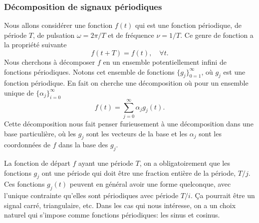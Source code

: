 \documentclass[a4paper,12pt]{book}
\begin{document}
\subsubsection{Décomposition de signaux périodiques}

Nous allons considérer une fonction $f(t)$ qui est une fonction périodique, de période $T$, de pulsation $\omega=2\pi/T$ et
de fréquence $\nu=1/T$. Ce genre de fonction a la propriété suivante
\begin{equation}
 f(t+T)=f(t),\quad \forall t.
\end{equation}
Nous cherchons à décomposer $f$ en un ensemble potentiellement infini de fonctions périodiques. Notons
cet ensemble de fonctions $\{g_j\}_{0=1}^\infty$, où $g_j$ est une fonction périodique. En fait on cherche une décomposition
où pour un ensemble unique de $\{\alpha_j\}_{i=0}^\infty$
\begin{equation}
 f(t)=\sum_{j=0}^\infty \alpha_j g_j(t).
\end{equation}
Cette décomposition nous fait penser furieusement à une décomposition dans une base particulière, 
où les $g_j$ sont les vecteurs de la base et les $\alpha_j$ sont les coordonnées de $f$ dans la base des $g_j$.

La fonction de départ $f$ ayant une période $T$, on a obligatoirement que les fonctions $g_j$ ont une période 
qui doit être une fraction entière de la période, $T/j$. Ces fonctions $g_j(t)$ peuvent en général
avoir une forme quelconque, avec l'unique contrainte qu'elles sont périodiques avec période $T/i$. 
\c Ca pourrait être un signal carré, triangulaire, etc. Dans les cas qui nous intéresse, on a un choix
naturel qui s'impose comme fonctions périodiques: les sinus et cosinus.
\end{document}

